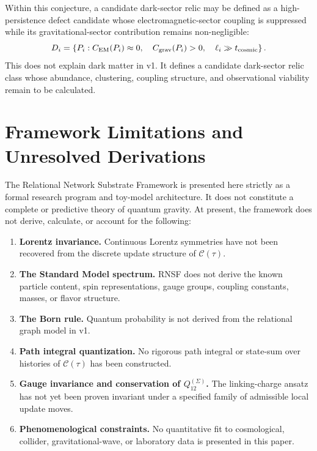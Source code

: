 \documentclass[11pt]{article}
\newcommand{\Ccal}{\mathcal{C}}
\newcommand{\Pfull}{P_i}
\newcommand{\Qlink}{Q_{12}^{(\Sigma)}}
\begin{document}
Within this conjecture, a candidate dark-sector relic may be defined as a high-persistence defect candidate whose electromagnetic-sector coupling is suppressed while its gravitational-sector contribution remains non-negligible:
\begin{equation}
    D_i=
    \left\{
    \Pfull:
    C_{\rm EM}(\Pfull)\approx 0,
    \quad
    C_{\rm grav}(\Pfull)>0,
    \quad
    \ell_i\gg t_{\rm cosmic}
    \right\}.
\end{equation}
This does not explain dark matter in v1. It defines a candidate dark-sector relic class whose abundance, clustering, coupling structure, and observational viability remain to be calculated.

\section{Framework Limitations and Unresolved Derivations}
\label{sec:limitations}

The Relational Network Substrate Framework is presented here strictly as a formal research program and toy-model architecture. It does not constitute a complete or predictive theory of quantum gravity. At present, the framework does not derive, calculate, or account for the following:

\begin{enumerate}
    \item \textbf{Lorentz invariance.} Continuous Lorentz symmetries have not been recovered from the discrete update structure of \(\Ccal(\tau)\).
    \item \textbf{The Standard Model spectrum.} RNSF does not derive the known particle content, spin representations, gauge groups, coupling constants, masses, or flavor structure.
    \item \textbf{The Born rule.} Quantum probability is not derived from the relational graph model in v1.
    \item \textbf{Path integral quantization.} No rigorous path integral or state-sum over histories of \(\Ccal(\tau)\) has been constructed.
    \item \textbf{Gauge invariance and conservation of \(\Qlink\).} The linking-charge ansatz has not yet been proven invariant under a specified family of admissible local update moves.
    \item \textbf{Phenomenological constraints.} No quantitative fit to cosmological, collider, gravitational-wave, or laboratory data is presented in this paper.
\end{enumerate}
\end{document}
